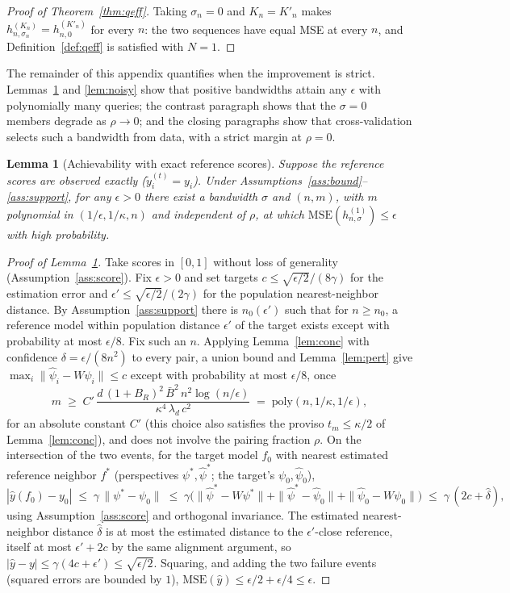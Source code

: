 \documentclass{article}
\newtheorem{lemma}{Lemma}
\theoremstyle{definition}
\theoremstyle{plain}
\begin{document}
\begin{proof}[Proof of Theorem~\ref{thm:qeff}]
Taking $\sigma_{n}=0$ and
$K_{n}=K'_{n}$ makes $h_{n,\sigma_{n}}^{(K_{n})}=h_{n,0}^{(K'_{n})}$ for every $n$:
the two sequences have equal MSE at every $n$, and Definition~\ref{def:qeff} is
satisfied with $N=1$.
\end{proof}

The remainder of this appendix quantifies when the improvement is strict.
Lemmas~\ref{lem:exact} and \ref{lem:noisy} show that positive bandwidths attain any
$\epsilon$ with polynomially many queries; the contrast paragraph shows that the
$\sigma=0$ members degrade as $\rho\to0$; and the closing paragraphs show that
cross-validation selects such a bandwidth from data, with a strict margin at
$\rho=0$.

\begin{lemma}[Achievability with exact reference scores]
\label{lem:exact}
Suppose the reference scores are observed exactly ($\tilde{y}_{i}^{(t)}=y_{i}$).
Under Assumptions~\ref{ass:bound}--\ref{ass:support}, for any $\epsilon>0$ there
exist a bandwidth $\sigma$ and $(n,m)$, with $m$ polynomial in
$(1/\epsilon,1/\kappa,n)$ and independent of $\rho$, at which
$\mathrm{MSE}(h_{n,\sigma}^{(1)})\le\epsilon$ with high probability.
\end{lemma}
\begin{proof}[Proof of Lemma~\ref{lem:exact}]
Take scores in $[0,1]$ without loss of
generality (Assumption~\ref{ass:score}). Fix $\epsilon>0$ and set targets $c\le\sqrt{\epsilon/2}/(8\gamma)$ for
the estimation error and $\epsilon'\le\sqrt{\epsilon/2}/(2\gamma)$ for the population
nearest-neighbor distance. By Assumption~\ref{ass:support} there is $n_0(\epsilon')$ such that for $n\ge n_0$, a
reference model within population distance $\epsilon'$ of the target exists except with
probability at most $\epsilon/8$. Fix such an $n$. Applying Lemma~\ref{lem:conc} with
confidence $\delta=\epsilon/(8n^2)$ to every pair, a union bound and
Lemma~\ref{lem:pert} give $\max_i\|\hat\psi_i-W\psi_i\|\le c$ except with probability at
most $\epsilon/8$, once
\[
m\;\ge\;C'\,\frac{d\,(1+B_R)^2\,\bar B^2\,n^2\log(n/\epsilon)}{\kappa^4\,\lambda_d\,c^2}
\;=\;\mathrm{poly}(n,1/\kappa,1/\epsilon),
\]
for an absolute constant $C'$ (this choice also satisfies the proviso
$t_m\le\kappa/2$ of Lemma~\ref{lem:conc}), and does not involve the pairing fraction
$\rho$. On the intersection of the two
events, for the target model $f_{0}$ with nearest estimated reference neighbor $f^*$
(perspectives $\psi^*,\hat\psi^*$; the target's $\psi_{0},\hat\psi_{0}$),
\[
|\hat y(f_{0})-y_{0}|\;\le\;\gamma\,\|\psi^*-\psi_{0}\|\;\le\;
\gamma\big(\|\hat\psi^*-W\psi^*\|+\|\hat\psi^*-\hat\psi_{0}\|+\|\hat\psi_{0}-W\psi_{0}\|\big)
\;\le\;\gamma\,(2c+\hat\delta),
\]
using Assumption~\ref{ass:score} and orthogonal invariance. The estimated nearest-neighbor distance
$\hat\delta$ is at most the estimated distance to the $\epsilon'$-close reference, itself
at most $\epsilon'+2c$ by the same alignment argument, so
$|\hat y-y|\le\gamma(4c+\epsilon')\le\sqrt{\epsilon/2}$. Squaring, and adding the two
failure events (squared errors are bounded by $1$),
$\mathrm{MSE}(\hat y)\le\epsilon/2+\epsilon/4\le\epsilon$.
\end{proof}
\end{document}
